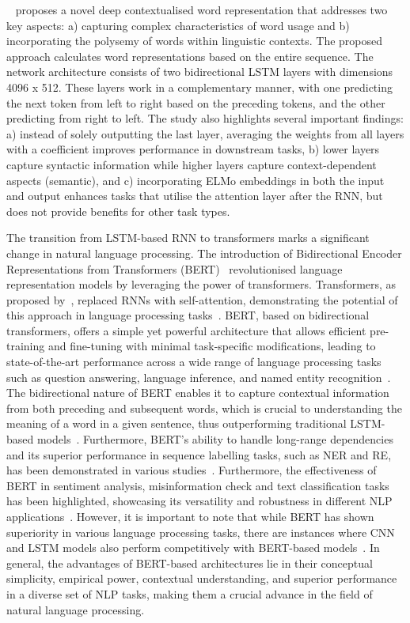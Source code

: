~\cite{peters2018deep} proposes a novel deep contextualised word representation that addresses two key aspects: a) capturing complex characteristics of word usage and b) incorporating the polysemy of words within linguistic contexts. The proposed approach calculates word representations based on the entire sequence. The network architecture consists of two bidirectional LSTM layers with dimensions 4096 x 512. These layers work in a complementary manner, with one predicting the next token from left to right based on the preceding tokens, and the other predicting from right to left. The study also highlights several important findings: a) instead of solely outputting the last layer, averaging the weights from all layers with a coefficient improves performance in downstream tasks, b) lower layers capture syntactic information while higher layers capture context-dependent aspects (semantic), and c) incorporating ELMo embeddings in both the input and output enhances tasks that utilise the attention layer after the RNN, but does not provide benefits for other task types.

The transition from LSTM-based RNN to transformers marks a significant change in natural language processing. The introduction of Bidirectional Encoder Representations from Transformers (BERT)~\cite{devlin2018bert} revolutionised language representation models by leveraging the power of transformers. Transformers, as proposed by~\cite{devlin2018bert}, replaced RNNs with self-attention, demonstrating the potential of this approach in language processing tasks~\cite{vaswani2017attention}. 
BERT, based on bidirectional transformers, offers a simple yet powerful architecture that allows efficient pre-training and fine-tuning with minimal task-specific modifications, leading to state-of-the-art performance across a wide range of language processing tasks such as question answering, language inference, and named entity recognition~\cite{devlin2018bert, joshi2019bert}. The bidirectional nature of BERT enables it to capture contextual information from both preceding and subsequent words, which is crucial to understanding the meaning of a word in a given sentence, thus outperforming traditional LSTM-based models~\cite{lee2019biobert, joshi2020deep}. Furthermore, BERT's ability to handle long-range dependencies and its superior performance in sequence labelling tasks, such as NER and RE, has been demonstrated in various studies~\cite{jung2021dg, hafiane2020experiments,kim2020korean}. Furthermore, the effectiveness of BERT in sentiment analysis, misinformation check and text classification tasks has been highlighted, showcasing its versatility and robustness in different NLP applications~\cite{ng2022modelling, shreyashree2022bert, taha2023automated}. 
However, it is important to note that while BERT has shown superiority in various language processing tasks, there are instances where CNN and LSTM models also perform competitively with BERT-based models~\cite{joshi2021evaluation,velankar2021hate}. 
In general, the advantages of BERT-based architectures lie in their conceptual simplicity, empirical power, contextual understanding, and superior performance in a diverse set of NLP tasks, making them a crucial advance in the field of natural language processing. 

